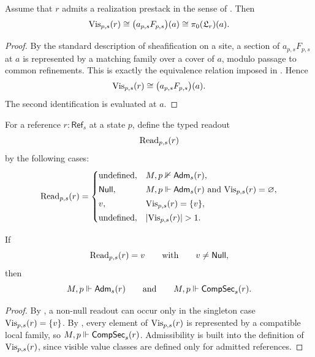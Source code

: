 \begin{theorem}\label{thm:visible-value-components}
Assume that $r$ admits a realization prestack in the sense of . Then
\[
\mathrm{Vis}_{p,s}(r)\cong \bigl(a_{p,s}F_{p,s}\bigr)(a)\cong \pi_0(\mathfrak L_r)(a).
\]
\end{theorem}

\begin{proof}
By the standard description of sheafification on a site, a section of $a_{p,s}F_{p,s}$ at $a$ is represented by a matching family over a cover of $a$, modulo passage to common refinements. This is exactly the equivalence relation imposed in . Hence
\[
\mathrm{Vis}_{p,s}(r)\cong \bigl(a_{p,s}F_{p,s}\bigr)(a).
\]
The second identification is  evaluated at $a$.
\end{proof}

\begin{definition}\label{def:typed-readout}
For a reference $r:\mathsf{Ref}_s$ at a state $p$, define the typed readout
\[
\mathrm{Read}_{p,s}(r)
\]
by the following cases:
\[
\Read_{p,s}(r)=
\begin{cases}
\text{undefined}, & M,p\nVdash \Adm_s(r),\\[0.5ex]
\Null, & M,p\Vdash \Adm_s(r)\ \text{and}\ \Vis_{p,s}(r)=\varnothing,\\[0.5ex]
v, & \Vis_{p,s}(r)=\{v\},\\[0.5ex]
\text{undefined}, & |\Vis_{p,s}(r)|>1.
\end{cases}
\]
\end{definition}

\begin{proposition}\label{prop:address-before-value}
If
\[
\mathrm{Read}_{p,s}(r)=v
\qquad\text{with}\qquad
v\neq \mathsf{Null},
\]
then
\[
M,p\Vdash \mathsf{Adm}_s(r)
\qquad\text{and}\qquad
M,p\Vdash \mathsf{CompSec}_s(r).
\]
\end{proposition}

\begin{proof}
By , a non-null readout can occur only in the singleton case $\mathrm{Vis}_{p,s}(r)=\{v\}$. By , every element of $\mathrm{Vis}_{p,s}(r)$ is represented by a compatible local family, so $M,p\Vdash \mathsf{CompSec}_s(r)$. Admissibility is built into the definition of $\mathrm{Vis}_{p,s}(r)$, since visible value classes are defined only for admitted references.
\end{proof}

